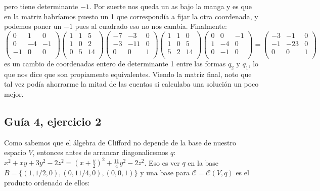 \documentclass[12pt]{amsart}
\newcommand{\cont}{\mathcal{C}}
\newcommand{\lp}{\left(}
\newcommand{\rp}{\right)}
\theoremstyle{plain}
\begin{document}
pero tiene determinante $-1$. Por suerte nos queda un as 
bajo la manga y es que en la matriz habríamos puesto un 1
que correspondía a fijar la otra coordenada, y podemos poner
un $-1$ pues al cuadrado eso no nos cambia. Finalmente:
$$\lp\begin{matrix}
    0&1&0 \\
    0&-4&-1 \\
    -1&0&0 \\
\end{matrix}\rp
\lp\begin{matrix}
    1&1&5 \\
    1&0&2 \\
    0&5&14 \\
\end{matrix}\rp
\lp\begin{matrix}
    -7&-3&0 \\
    -3&-11&0 \\
    0&0&1 \\
\end{matrix}\rp
\lp\begin{matrix}
    1&1&0 \\
    1&0&5 \\
    5&2&14 \\
\end{matrix}\rp
\lp\begin{matrix}
    0&0&-1 \\
    1&-4&0 \\
    0&-1&0 \\
\end{matrix}\rp = 
\lp\begin{matrix}
    -3&-1&0 \\
    -1&-23&0 \\
    0&0&1 \\
\end{matrix}\rp$$
es un cambio de coordenadas entero de determinante 1 entre
las formas $q_2$ y $q_1$, lo que nos dice que son propiamente
equivalentes. Viendo la matriz final, noto que tal vez podía 
ahorrarme la mitad de las cuentas si calculaba una solución 
un poco mejor.

\subsection*{Guía 4, ejercicio 2}
Como sabemos que el álgebra de Clifford no depende de la base de 
nuestro espacio $V$, entonces antes de arrancar diagonalicemos $q$:
$x^2+xy+3y^2-2z^2 = (x+\frac{y}{2})^2+\frac{11}{4} y^2-2z^2$. Eso 
es ver $q$ en la base $B=\{(1,1/2,0),(0,11/4,0),(0,0,1)\}$ y una 
base para $\cont=\cont(V,q)$ es el producto ordenado de ellos:
\end{document}
